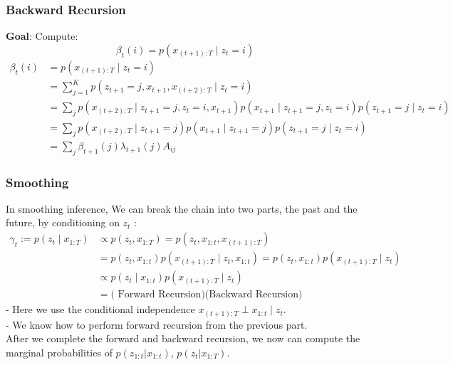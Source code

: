 \subsubsection*{Backward Recursion}
\textbf{Goal}: Compute:
$$\beta_t(i) = p\left(x_{(t+1): T} \mid z_t=i\right)$$
\begin{align*} 
    \beta_t(i) & =p\left(x_{(t+1): T} \mid z_t=i\right)\\
    & =\sum_{j=1}^K p\left(z_{t+1}=j, x_{t+1}, x_{(t+2): T} \mid z_t=i\right) \\ 
    & =\sum_j p\left(x_{(t+2): T} \mid z_{t+1}=j, z_t=i, x_{t+1}\right) p\left(x_{t+1} \mid z_{t+1}=j, z_t=i\right) p\left(z_{t+1}=j \mid z_t=i\right) \\ 
    & =\sum_j p\left(x_{(t+2): T} \mid z_{t+1}=j\right) p\left(x_{t+1} \mid z_{t+1}=j\right) p\left(z_{t+1}=j \mid z_t=i\right) \\ 
    & =\sum_j \beta_{t+1}(j) \lambda_{t+1}(j) A_{i j}
\end{align*}
\subsubsection*{Smoothing}
In smoothing inference, We can break the chain into two parts, the past and the future, by conditioning on $z_t$ :
$$
\begin{aligned}
\gamma_t:=p\left(z_t \mid x_{1: T}\right) & \propto p\left(z_t, x_{1: T}\right)=p\left(z_t, x_{1: t}, x_{(t+1): T}\right) \\
& =p\left(z_t, x_{1: t}\right) p\left(x_{(t+1): T} \mid z_t, x_{1: t}\right)=p\left(z_t, x_{1: t}\right) p\left(x_{(t+1): T} \mid z_t\right) \\
& \propto p\left(z_t \mid x_{1: t}\right) p\left(x_{(t+1): T} \mid z_t\right) \\
& =(\text { Forward Recursion)(Backward Recursion) }
\end{aligned}
$$
- Here we use the conditional independence $x_{(t+1): T} \perp x_{1: t} \mid z_t$.\\
- We know how to perform forward recursion from the previous part.\\

After we complete the forward and backward recursion, we now can compute the marginal probabilities of $p(z_{1:t}|x_{1:t})$, $p(z_t|x_{1:T})$. 

